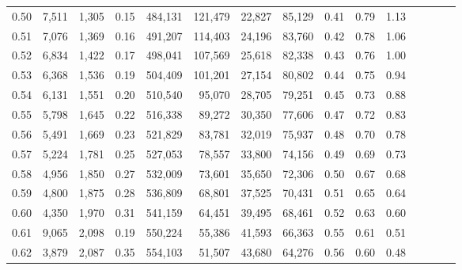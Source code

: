 \begin{tabular}{rrrcrrrrrrrrrrr}
0.50 &   7,511 &  1,305 &                                       0.15 &  484,131 &  121,479 &   22,827 &   85,129 &  0.41 &  0.79 &                         1.13 \\
0.51 &   7,076 &  1,369 &                                       0.16 &  491,207 &  114,403 &   24,196 &   83,760 &  0.42 &  0.78 &                         1.06 \\
0.52 &   6,834 &  1,422 &                                       0.17 &  498,041 &  107,569 &   25,618 &   82,338 &  0.43 &  0.76 &                         1.00 \\
0.53 &   6,368 &  1,536 &                                       0.19 &  504,409 &  101,201 &   27,154 &   80,802 &  0.44 &  0.75 &                         0.94 \\
0.54 &   6,131 &  1,551 &                                       0.20 &  510,540 &   95,070 &   28,705 &   79,251 &  0.45 &  0.73 &                         0.88 \\
0.55 &   5,798 &  1,645 &                                       0.22 &  516,338 &   89,272 &   30,350 &   77,606 &  0.47 &  0.72 &                         0.83 \\
0.56 &   5,491 &  1,669 &                                       0.23 &  521,829 &   83,781 &   32,019 &   75,937 &  0.48 &  0.70 &                         0.78 \\
0.57 &   5,224 &  1,781 &                                       0.25 &  527,053 &   78,557 &   33,800 &   74,156 &  0.49 &  0.69 &                         0.73 \\
0.58 &   4,956 &  1,850 &                                       0.27 &  532,009 &   73,601 &   35,650 &   72,306 &  0.50 &  0.67 &                         0.68 \\
0.59 &   4,800 &  1,875 &                                       0.28 &  536,809 &   68,801 &   37,525 &   70,431 &  0.51 &  0.65 &                         0.64 \\
0.60 &   4,350 &  1,970 &                                       0.31 &  541,159 &   64,451 &   39,495 &   68,461 &  0.52 &  0.63 &                         0.60 \\
0.61 &   9,065 &  2,098 &                                       0.19 &  550,224 &   55,386 &   41,593 &   66,363 &  0.55 &  0.61 &                         0.51 \\
0.62 &   3,879 &  2,087 &                                       0.35 &  554,103 &   51,507 &   43,680 &   64,276 &  0.56 &  0.60 &                         0.48 \\

\end{tabular}
